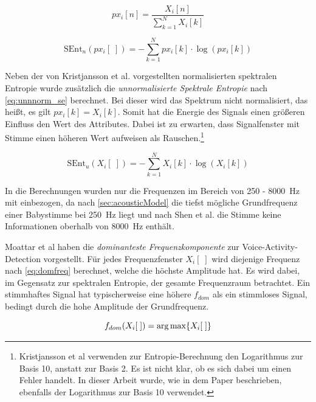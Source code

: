 \begin{equation}
px_i[n] = \frac{X_i[n]}{\sum_{k=1}^{N} X_i[k]}
\label{eq:norm_spek}
\end{equation}

\begin{equation}
\text{SEnt}_n(px_i[\;]) = -\sum_{k=1}^{N}px_i[k] \cdot\log(px_i[k])
\label{eq:norm_se}
\end{equation}

Neben der von Kristjansson et al. \cite{vad_Lisboa} vorgestellten normalisierten spektralen Entropie wurde zusätzlich die \emph{unnormalisierte Spektrale Entropie} nach \autoref{eq:unnnorm_se} berechnet. Bei dieser wird das Spektrum nicht normalisiert, das heißt, es gilt $px_i[k] = X_i[k]$. Somit hat die Energie des Signals einen größeren Einfluss den Wert des Attributes. Dabei ist zu erwarten, dass Signalfenster mit Stimme einen höheren Wert aufweisen als Rauschen.\footnote{Kristjansson et al \cite[S. 2]{vad_Lisboa} verwenden zur Entropie-Berechnung den Logarithmus zur Basis 10, anstatt zur Basis 2. Es ist nicht klar, ob es sich dabei um einen Fehler handelt. In dieser Arbeit wurde, wie in dem Paper beschrieben, ebenfalls der Logarithmus zur Basis 10 verwendet.}

\begin{equation}
\text{SEnt}_u(X_i[\;]) = -\sum_{k=1}^{N}X_i[k] \cdot\log(X_i[k])
\label{eq:unnnorm_se}
\end{equation}

In die Berechnungen wurden nur die Frequenzen im Bereich von 250 - \SI{8000}{\hertz} mit einbezogen, da nach \autoref{sec:acousticModel} die tiefst mögliche Grundfrequenz einer Babystimme bei \SI{250}{\hertz} liegt und nach Shen et al. \cite{vad_entropie02} die Stimme keine Informationen oberhalb von \SI{8000}{\hertz} enthält.

Moattar et al \cite[S. 2550]{vad_Easy} haben die \emph{dominanteste Frequenzkomponente} zur Voice-Activity-Detection vorgestellt. Für jedes Frequenzfenster $X_i[\;]$ wird diejenige Frequenz nach  \autoref{eq:domfreq} berechnet, welche die höchste Amplitude hat. Es wird dabei, im Gegensatz zur spektralen Entropie, der gesamte Frequenzraum betrachtet. Ein stimmhaftes Signal hat typischerweise eine höhere $f_{dom}$ als ein stimmloses Signal, bedingt durch die hohe Amplitude der Grundfrequenz.

\begin{equation}
f_{dom}(X_i[\;]) = \operatorname*{arg\,max} \{X_i[\;]\}
\label{eq:domfreq}
\end{equation}


